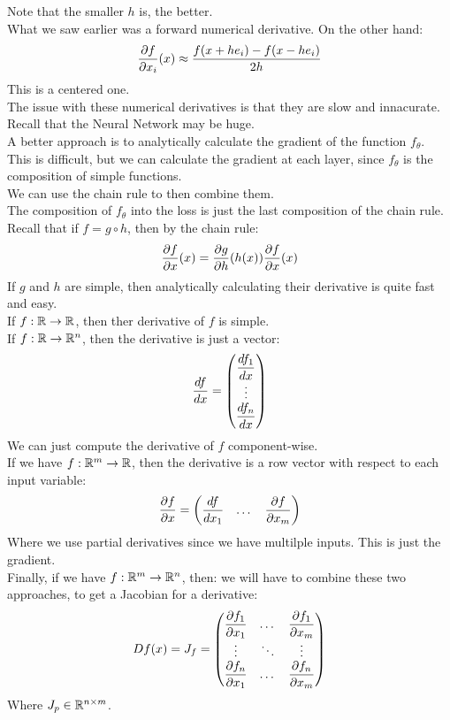 \documentclass[12pt]{article}
\begin{document}
Note that the smaller $h$ is, the better. \\

What we saw earlier was a forward numerical
derivative. On the other hand:
\[ \dfrac{\partial f}{\partial x_i}(x) \approx 
\dfrac{f(x + h e_i) - f(x - h e_i)}{2h} \]
This is a centered one. \\

The issue with these numerical derivatives is
that they are slow and innacurate. \\
Recall that the Neural Network may be huge. \\

A better approach is to analytically
calculate the gradient of the function $f_\theta$. \\
This is difficult, but we can calculate the 
gradient at each layer, since $f_\theta$
is the composition of simple functions. \\
We can use the chain rule to then combine them. \\
The composition of $f_\theta$ into the loss is
just the last composition of the chain rule. \\

Recall that if $f = g \circ h$, then by the chain rule:
\[ \dfrac{\partial f}{\partial x}(x)
= \dfrac{\partial g}{\partial h}(h(x))\dfrac{\partial f}{\partial x}(x) \]
If $g$ and $h$ are simple, then analytically
calculating their derivative is quite fast
and easy. \\

If $f: \mathbb{R} \to \mathbb{R}$,
then ther derivative of $f$ is simple. \\

If $f: \mathbb{R} \to \mathbb{R}^n$, then the derivative
is just a vector:
\[ \dfrac{df}{dx}
= \begin{pmatrix} \dfrac{df_1}{dx} \\ \vdots \\ \dfrac{df_n}{dx} \end{pmatrix} \]
We can just compute the derivative
of $f$ component-wise. \\

If we have $f: \mathbb{R}^m \to \mathbb{R}$, then
the derivative is a row vector
with respect to each input variable:
\[ \dfrac{\partial f}{\partial x}
= \begin{pmatrix} \dfrac{df}{dx_1} & \dots & \dfrac{\partial f}{\partial x_m} \end{pmatrix} \]
Where we use partial derivatives since we have
multilple inputs. This is just the gradient. \\

Finally, if we have $f: \mathbb{R}^m \to \mathbb{R}^n$, then:
we will have to combine these two approaches,
to get a Jacobian for a derivative:
\[ Df(x) = J_f = \begin{pmatrix} \dfrac{\partial f_1}{\partial x_1} & \dots & 
\dfrac{\partial f_1}{\partial x_m} \\ \vdots & \ddots & \vdots \\ 
\dfrac{\partial f_n}{\partial x_1} & \dots & \dfrac{\partial f_n}{\partial x_m} \end{pmatrix} \]
Where $J_p \in \mathbb{R}^{n \times m}$. \\
\end{document}

